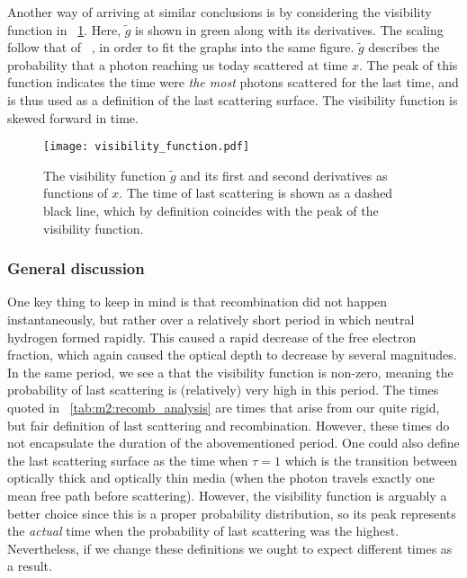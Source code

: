     Another way of arriving at similar conclusions is by considering the visibility function in ~\cref{fig:m2:visibility_function}. Here, $\tilde{g}$ is shown in green along with its derivatives. The scaling follow that of ~\cite{https://doi.org/10.48550/arxiv.astro-ph/0606683}, in order to fit the graphs into the same figure. $\tilde{g}$ describes the probability that a photon reaching us today scattered at time $x$. The peak of this function indicates the time were \textit{the most} photons scattered for the last time, and is thus used as a definition of the last scattering surface. The visibility function is skewed forward in time.
    \begin{figure}
        \texttt{[image: visibility\_function.pdf]}
        \caption{The visibility function $\tilde{g}$ and its first and second derivatives as functions of $x$. The time of last scattering is shown as a dashed black line, which by definition coincides with the peak of the visibility function.}
        \label{fig:m2:visibility_function}
    \end{figure}

    \subsubsection{General discussion}
    One key thing to keep in mind is that recombination did not happen instantaneously, but rather over a relatively short period in which neutral hydrogen formed rapidly. This caused a rapid decrease of the free electron fraction, which again caused the optical depth to decrease by several magnitudes. In the same period, we see a that the visibility function is non-zero, meaning the probability of last scattering is (relatively) very high in this period. The times quoted in ~\cref{tab:m2:recomb_analysis} are times that arise from our quite rigid, but fair definition of last scattering and recombination. However, these times do not encapsulate the duration of the abovementioned period.  One could also define the last scattering surface as the time when $\tau=1$ which is the transition between optically thick and optically thin media (when the photon travels exactly one mean free path before scattering). However, the visibility function is arguably a better choice since this is a proper probability distribution, so its peak represents the \textit{actual} time when the probability of last scattering was the highest. Nevertheless, if we change these definitions we ought to expect different times as a result.

